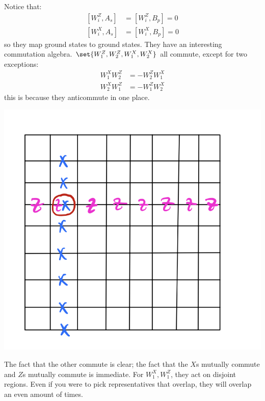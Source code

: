 Notice that:
\begin{equation}
    \begin{split}
        [W_i^Z, A_s] &= [W_i^Z, B_p] = 0
        \\ [W_i^X, A_s] &= [W_i^X, B_p] = 0
    \end{split}
\end{equation}
so they map ground states to ground states. They have an interesting commutation algebra. $\set{W_1^Z, W_2^Z, W_1^X, W_2^X}$ all commute, except for two exceptions:
\begin{equation}
    \begin{split}
        W_1^XW_2^Z &=  -W_2^ZW_1^X
        \\ W_2^XW_1^Z &=  -W_1^ZW_2^X
    \end{split}
\end{equation}
this is because they anticommute in one place.

\begin{center}
    \includegraphics[scale=0.4]{Lectures/Images/lec2-torusanticommute.png}
\end{center}

The fact that the other commute is clear; the fact that the $X$s mutually commute and $Z$s mutually commute is immediate. For $W_1^X, W_1^Z$, they act on disjoint regions. Even if you were to pick representatives that overlap, they will overlap an even amount of times.


